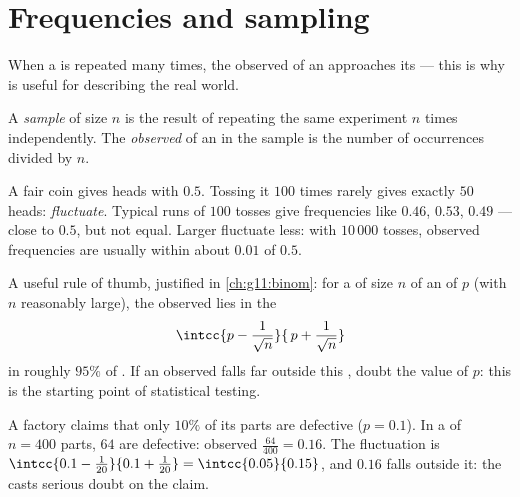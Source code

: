 \section{Frequencies and sampling}

When a  is repeated many times, the observed 
of an  approaches its  --- this is why  is
useful for describing the real world.

\begin{definition}[Sample]\label{def:g10:proba:sample}
A \emph{sample} of size $n$ is the result of repeating the
same experiment $n$ times independently. The \emph{observed } of
an  in the sample is the number of occurrences divided by $n$.
\end{definition}

\begin{example}\label{ex:g10:proba:sampling}
A fair coin gives heads with  $0.5$. Tossing it $100$ times
rarely gives exactly $50$ heads:  \emph{fluctuate}. Typical runs of
$100$ tosses give frequencies like $0.46$, $0.53$, $0.49$ --- close to
$0.5$, but not equal. Larger  fluctuate less: with $10\,000$
tosses, observed frequencies are usually within about $0.01$ of $0.5$.
\end{example}

\begin{remark}
A useful rule of thumb, justified in \cref{ch:g11:binom}: for a  of
size $n$ of an  of  $p$ (with $n$ reasonably large), the
observed  lies in the 
\[
\intcc{p - \frac{1}{\sqrt n}}{\,p + \frac{1}{\sqrt n}}
\]
in roughly $95\%$ of . If an observed  falls far outside
this , doubt the value of $p$: this is the starting point of
statistical testing.
\end{remark}

\begin{example}\label{ex:g10:proba:test}
A factory claims that only $10\%$ of its parts are defective
($p = 0.1$). In a  of $n = 400$ parts, $64$ are defective: observed
 $\frac{64}{400} = 0.16$. The fluctuation  is
$\intcc{0.1 - \frac{1}{20}}{0.1 + \frac{1}{20}} = \intcc{0.05}{0.15}$,
and $0.16$ falls outside it: the  casts serious doubt on the claim.
\end{example}


